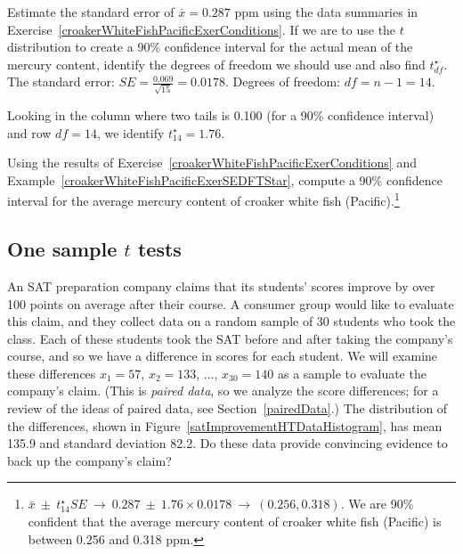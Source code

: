 \begin{example}{Estimate the standard error of $\bar{x}=0.287$ ppm using the data summaries in Exercise~\ref{croakerWhiteFishPacificExerConditions}. If we are to use the $t$ distribution to create a 90\% confidence interval for the actual mean of the mercury content, identify the degrees of freedom we should use and also find $t^{\star}_{df}$.}
\label{croakerWhiteFishPacificExerSEDFTStar}
The standard error: $SE = \frac{0.069}{\sqrt{15}} = 0.0178$. Degrees of freedom: $df = n - 1 = 14$.

Looking in the column where two tails is 0.100 (for a 90\% confidence interval) and row $df=14$, we identify $t^{\star}_{14} = 1.76$.
\end{example}

\begin{exercise}
Using the results of Exercise~\ref{croakerWhiteFishPacificExerConditions} and Example~\ref{croakerWhiteFishPacificExerSEDFTStar}, compute a 90\% confidence interval for the average mercury content of croaker white fish (Pacific).\footnote{$\bar{x} \ \pm\ t^{\star}_{14} SE \ \to\  0.287 \ \pm\  1.76\times 0.0178\ \to\ (0.256, 0.318)$. We are 90\% confident that the average mercury content of croaker white fish (Pacific) is between 0.256 and 0.318 ppm.}


\end{exercise}



\subsection{One sample $t$ tests}
\label{oneSampleTTests}


An SAT preparation company claims that its students' scores improve by over 100 points on average after their course. A consumer group would like to evaluate this claim, and they collect data on a random sample of 30 students who took the class. Each of these students took the SAT before and after taking the company's course, and so we have a difference in scores for each student. We will examine these differences $x_1=57$, $x_2=133$, ..., $x_{30}=140$ as a sample to evaluate the company's claim. 
(This is \emph{paired data}, so we analyze the score differences; for a review of the ideas of paired data, see Section~\ref{pairedData}.) 
The distribution of the differences, shown in Figure~\ref{satImprovementHTDataHistogram}, has mean 135.9 and standard deviation 82.2. Do these data provide convincing evidence to back up the company's claim? 

